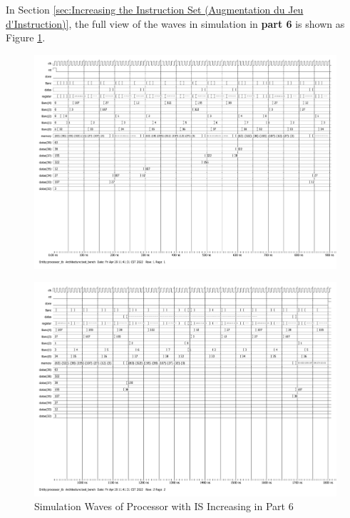 \documentclass[12pt,a4paper]{article}
\begin{document}
In Section \ref{sec:Increasing the Instruction Set (Augmentation du Jeu d'Instruction)}, 
the full view of the waves in simulation in \textbf{part 6} is shown 
as Figure \ref{fig:ModelSim_ assemblage_tous_tb(test_bench)}.
\begin{figure}[htp]
  \centering
    \includegraphics[width=1.5\textwidth,angle = 270]{picture/ModelSim_ assemblage_tous_tb(test_bench) 1.pdf}
\end{figure}

\begin{figure}[htp]
  \centering
    \includegraphics[width=1.5\textwidth,angle = 270]{picture/ModelSim_ assemblage_tous_tb(test_bench) 2.pdf}
    \caption{Simulation Waves of Processor with IS Increasing in Part 6}  
  \label{fig:ModelSim_ assemblage_tous_tb(test_bench)}
\end{figure}




\clearpage


\end{document}
